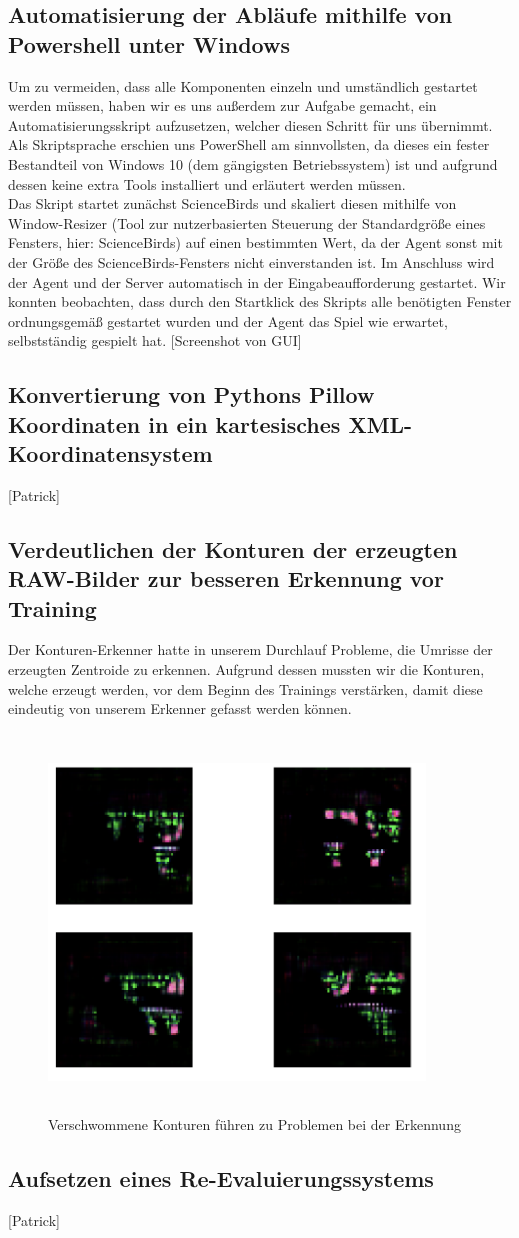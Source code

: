 \subsection{Automatisierung der Abläufe mithilfe von Powershell unter Windows}
Um zu vermeiden, dass alle Komponenten einzeln und umständlich gestartet werden müssen, haben wir es uns außerdem zur Aufgabe gemacht, ein Automatisierungsskript aufzusetzen, welcher diesen Schritt für uns übernimmt. Als Skriptsprache erschien uns PowerShell am sinnvollsten, da dieses ein fester Bestandteil von Windows 10 (dem gängigsten Betriebssystem) ist und aufgrund dessen keine extra Tools installiert und erläutert werden müssen. \\Das Skript startet zunächst ScienceBirds und skaliert diesen mithilfe von Window-Resizer (Tool zur nutzerbasierten Steuerung der Standardgröße eines Fensters, hier: ScienceBirds) auf einen bestimmten Wert, da der Agent sonst mit der Größe des ScienceBirds-Fensters nicht einverstanden ist. Im Anschluss wird der Agent und der Server automatisch in der Eingabeaufforderung gestartet. Wir konnten beobachten, dass durch den Startklick des Skripts alle benötigten Fenster ordnungsgemäß gestartet wurden und der Agent das Spiel wie erwartet, selbstständig gespielt hat. [Screenshot von GUI]
\subsection{Konvertierung von Pythons Pillow Koordinaten in ein kartesisches XML-Koordinatensystem}
[Patrick]
\subsection{Verdeutlichen der Konturen der erzeugten RAW-Bilder zur besseren Erkennung vor Training}
Der Konturen-Erkenner hatte in unserem Durchlauf Probleme, die Umrisse der erzeugten Zentroide zu erkennen. Aufgrund dessen mussten wir die Konturen, welche erzeugt werden, vor dem Beginn des Trainings verstärken, damit diese eindeutig von unserem Erkenner gefasst werden können. \\
\begin{figure}
	\centering
	\includegraphics[height=10cm, width=10cm]{img/blurry_attempts.png}
	\caption{Verschwommene Konturen führen zu Problemen bei der Erkennung}
\end{figure}
\subsection{Aufsetzen eines Re-Evaluierungssystems}
[Patrick]